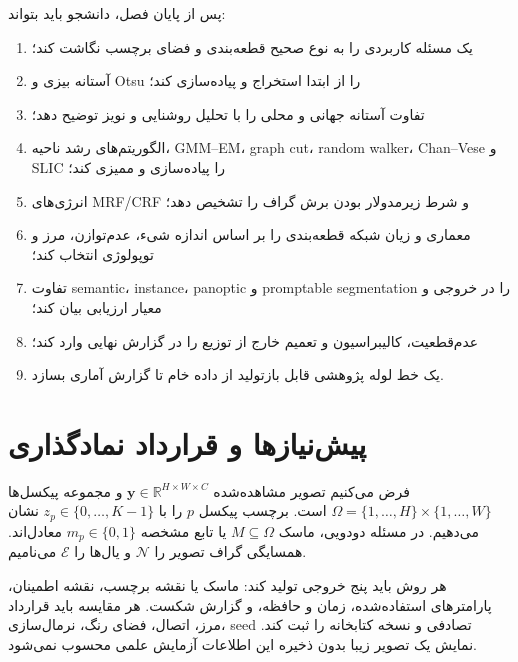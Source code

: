 \documentclass[12pt,openany,oneside]{book}
\newcommand{\R}{\mathbb{R}}
\newcommand{\vect}[1]{\bm{#1}}
\begin{document}
\begin{learningbox}
پس از پایان فصل، دانشجو باید بتواند:
\begin{enumerate}
\item یک مسئله کاربردی را به نوع صحیح قطعه‌بندی و فضای برچسب نگاشت کند؛
\item آستانه بیزی و Otsu را از ابتدا استخراج و پیاده‌سازی کند؛
\item تفاوت آستانه جهانی و محلی را با تحلیل روشنایی و نویز توضیح دهد؛
\item الگوریتم‌های رشد ناحیه، GMM--EM، graph cut، random walker، Chan--Vese و SLIC را پیاده‌سازی و ممیزی کند؛
\item انرژی‌های MRF/CRF و شرط زیرمدولار بودن برش گراف را تشخیص دهد؛
\item معماری و زیان شبکه قطعه‌بندی را بر اساس اندازه شیء، عدم‌توازن، مرز و توپولوژی انتخاب کند؛
\item تفاوت semantic، instance، panoptic و promptable segmentation را در خروجی و معیار ارزیابی بیان کند؛
\item عدم‌قطعیت، کالیبراسیون و تعمیم خارج از توزیع را در گزارش نهایی وارد کند؛
\item یک خط لوله پژوهشی قابل بازتولید از داده خام تا گزارش آماری بسازد.
\end{enumerate}
\end{learningbox}

\chapter*{پیش‌نیازها و قرارداد نمادگذاری}
فرض می‌کنیم تصویر مشاهده‌شده \(\vect y\in\R^{H\times W\times C}\) و مجموعه پیکسل‌ها
\(\Omega=\{1,\ldots,H\}\times\{1,\ldots,W\}\) است. برچسب پیکسل \(p\) را با
\(z_p\in\{0,\ldots,K-1\}\) نشان می‌دهیم. در مسئله دودویی، ماسک
\(M\subseteq\Omega\) یا تابع مشخصه \(m_p\in\{0,1\}\) معادل‌اند. همسایگی گراف تصویر را
\(\mathcal N\) و یال‌ها را \(\mathcal E\) می‌نامیم.

\begin{codecontract}
هر روش باید پنج خروجی تولید کند: ماسک یا نقشه برچسب، نقشه اطمینان، پارامترهای استفاده‌شده، زمان و حافظه، و
گزارش شکست. هر مقایسه باید قرارداد مرز، اتصال، فضای رنگ، نرمال‌سازی، seed تصادفی و نسخه کتابخانه را ثبت کند.
نمایش یک تصویر زیبا بدون ذخیره این اطلاعات آزمایش علمی محسوب نمی‌شود.
\end{codecontract}

\tableofcontents
\mainmatter
\setcounter{chapter}{7}
\end{document}
